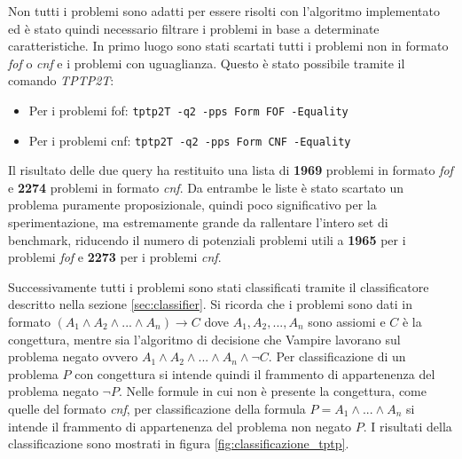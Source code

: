 \documentclass[./main.tex]{subfiles}
\begin{document}
Non tutti i problemi sono adatti per essere risolti con l'algoritmo implementato ed è 
stato quindi necessario filtrare i problemi in base a determinate caratteristiche.
In primo luogo sono stati scartati tutti i problemi non in formato \textit{fof} o \textit{cnf} e
i problemi con uguaglianza. Questo è stato possibile tramite il comando \textit{TPTP2T}:

\begin{itemize}
    \item Per i problemi fof: \texttt{tptp2T -q2 -pps Form FOF -Equality}
    \item Per i problemi cnf: \texttt{tptp2T -q2 -pps Form CNF -Equality}
\end{itemize}

Il risultato delle due query ha restituito una lista di \textbf{1969} problemi in formato \textit{fof} e
\textbf{2274} problemi in formato \textit{cnf}. 
Da entrambe le liste è stato scartato un problema puramente proposizionale,
quindi poco significativo per la sperimentazione, ma estremamente grande da rallentare l'intero set di benchmark,
riducendo il numero di potenziali problemi utili a \textbf{1965} per i problemi \textit{fof} e \textbf{2273} per i problemi \textit{cnf}.

Successivamente tutti i problemi sono stati classificati tramite il classificatore descritto nella sezione \ref{sec:classifier}.
Si ricorda che i problemi sono dati in formato $(A_1 \land A_2 \land ... \land A_n) \rightarrow C$ dove 
$A_1, A_2, ..., A_n$ sono assiomi e $C$ è la congettura, mentre 
sia l'algoritmo di decisione che Vampire lavorano sul problema negato ovvero $A_1 \land A_2 \land ... \land A_n \land \lnot C$.
Per classificazione di un problema $P$ con congettura si intende quindi il frammento di appartenenza del problema negato $\lnot P$.
Nelle formule in cui non è presente la congettura, come quelle del formato \textit{cnf}, 
per classificazione della formula $P = A_1 \land ... \land A_n$ si intende il frammento di appartenenza del
problema non negato $P$.
I risultati della classificazione sono mostrati in figura \ref{fig:classificazione_tptp}.
\end{document}
